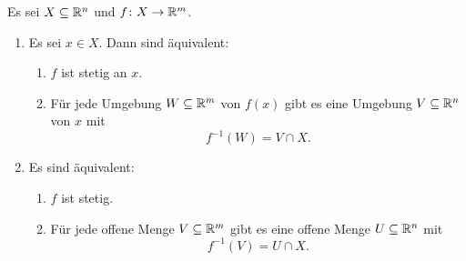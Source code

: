 \documentclass[a4paper,10pt]{article}
\begin{document}
\begin{lem}
 Es sei $X \subseteq \mathbb{R}^n$ und $f \colon X \to \mathbb{R}^m$.
 \begin{enumerate}
  \item
   Es sei $x \in X$. Dann sind äquivalent:
   \begin{enumerate}
    \item\label{enum: stetig an x epsilon delta}
     $f$ ist stetig an $x$.
    \item\label{enum: stetig an x Umgebungen}
     Für jede Umgebung $W \subseteq \mathbb{R}^m$ von $f(x)$ gibt es eine Umgebung $V \subseteq \mathbb{R}^n$ von $x$ mit
     \[
      f^{-1}(W) = V \cap X.
     \]
   \end{enumerate}
  \item
   Es sind äquivalent:
   \begin{enumerate}
    \item\label{enum: stetig epsilon delta}
     $f$ ist stetig.
    \item\label{enum: stetig offene Mengen}
     Für jede offene Menge $V \subseteq \mathbb{R}^m$ gibt es eine offene Menge $U \subseteq \mathbb{R}^n$ mit
     \[
      f^{-1}(V) = U \cap X.
     \]
   \end{enumerate}
 \end{enumerate}
\end{lem}
\end{document}
